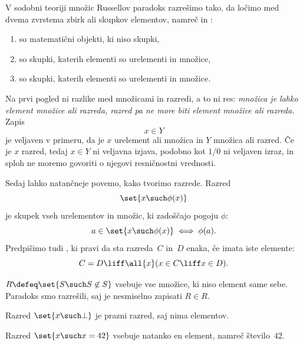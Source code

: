 V sodobni teoriji množic Russellov paradoks razrešimo tako, da ločimo med dvema
zvrstema zbirk ali skupkov elementov, namreč  in :
%
\begin{enumerate}
\item {} so matematični objekti, ki niso skupki,
\item {} so skupki, katerih elementi so urelementi in množice,
\item {} so skupki, katerih elementi so urelementi in množice.
\end{enumerate}
%
Na prvi pogled ni razlike med množicami in razredi, a to ni res:
\emph{množica je lahko element množice ali razreda,
razred pa ne more biti element množice ali razreda.}
%
Zapis
%
\begin{equation*}
    x \in Y
  \end{equation*}
%
je veljaven v primeru, da je $x$ urelement ali množica in $Y$ množica ali razred.
Če je $x$ razred, tedaj $x \in Y$ ni veljavna izjava, podobno kot $1/0$ ni veljaven izraz, in sploh ne moremo govoriti o njegovi resničnostni vrednosti.

Sedaj lahko natančneje povemo, kako tvorimo razrede. Razred
%
\begin{equation*}
  \set{ x \such \phi(x) }
\end{equation*}
%
je skupek vseh urelementov in množic, ki zadoščajo pogoju $\phi$:
%
\begin{equation*}
    a \in \set{ x \such \phi(x) } \iff \phi(a).
\end{equation*}
%
Predpišimo tudi , ki pravi da sta razreda~$C$ in~$D$ enaka, če imata iste elemente:
%
\begin{equation*}
  C = D \liff \all{x} (x \in C \liff x \in D).
\end{equation*}

\begin{zgled}
   $R \defeq \set{ S \such S \not\in S }$ vsebuje vse množice, ki niso element same sebe. Paradoks smo razrešili, saj je nesmiselno zapisati $R \in R$.
\end{zgled}

\begin{zgled}
  Razred $\set{x \such \bot}$ je prazni razred, saj nima elementov.
\end{zgled}

\begin{zgled}
  Razred $\set{x \such x = 42}$ vsebuje natanko en element, namreč število~$42$.
\end{zgled}

